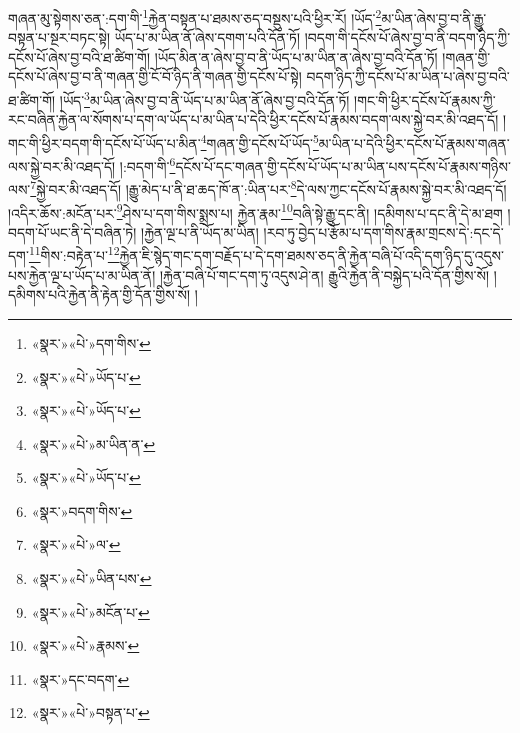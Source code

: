གཞན་མུ་སྟེགས་ཅན་:དག་གི་\footnote{«སྣར་»«པེ་»དག་གིས་}རྐྱེན་བསྟན་པ་ཐམས་ཅད་བསྡུས་པའི་ཕྱིར་རོ། །ཡོད་\footnote{«སྣར་»«པེ་»ཡོད་པ་}མ་ཡིན་ཞེས་བྱ་བ་ནི་རྒྱུ་བསྟན་པ་སྔར་བཏང་སྟེ། ཡོད་པ་མ་ཡིན་ནོ་ཞེས་དགག་པའི་དོན་ཏོ། །བདག་གི་དངོས་པོ་ཞེས་བྱ་བ་ནི་བདག་ཉིད་ཀྱི་དངོས་པོ་ཞེས་བྱ་བའི་ཐ་ཚིག་གོ། །ཡོད་མིན་ན་ཞེས་བྱ་བ་ནི་ཡོད་པ་མ་ཡིན་ན་ཞེས་བྱ་བའི་དོན་ཏོ། །གཞན་གྱི་དངོས་པོ་ཞེས་བྱ་བ་ནི་གཞན་གྱི་ངོ་བོ་ཉིད་ནི་གཞན་གྱི་དངོས་པོ་སྟེ། བདག་ཉིད་ཀྱི་དངོས་པོ་མ་ཡིན་པ་ཞེས་བྱ་བའི་ཐ་ཚིག་གོ། །ཡོད་\footnote{«སྣར་»«པེ་»ཡོད་པ་}མ་ཡིན་ཞེས་བྱ་བ་ནི་ཡོད་པ་མ་ཡིན་ནོ་ཞེས་བྱ་བའི་དོན་ཏོ། །གང་གི་ཕྱིར་དངོས་པོ་རྣམས་ཀྱི་རང་བཞིན་རྐྱེན་ལ་སོགས་པ་དག་ལ་ཡོད་པ་མ་ཡིན་པ་དེའི་ཕྱིར་དངོས་པོ་རྣམས་བདག་ལས་སྐྱེ་བར་མི་འཐད་དོ། །གང་གི་ཕྱིར་བདག་གི་དངོས་པོ་ཡོད་པ་མིན་\footnote{«སྣར་»«པེ་»མ་ཡིན་ན་}གཞན་གྱི་དངོས་པོ་ཡོད་\footnote{«སྣར་»«པེ་»ཡོད་པ་}མ་ཡིན་པ་དེའི་ཕྱིར་དངོས་པོ་རྣམས་གཞན་ལས་སྐྱེ་བར་མི་འཐད་དོ། །:བདག་གི་\footnote{«སྣར་»བདག་གིས་}དངོས་པོ་དང་གཞན་གྱི་དངོས་པོ་ཡོད་པ་མ་ཡིན་པས་དངོས་པོ་རྣམས་གཉིས་ལས་\footnote{«སྣར་»«པེ་»ལ་}སྐྱེ་བར་མི་འཐད་དོ། །རྒྱུ་མེད་པ་ནི་ཐ་ཆད་ཁོ་ན་:ཡིན་པར་\footnote{«སྣར་»«པེ་»ཡིན་པས་}དེ་ལས་ཀྱང་དངོས་པོ་རྣམས་སྐྱེ་བར་མི་འཐད་དོ། །འདིར་ཆོས་:མངོན་པར་\footnote{«སྣར་»«པེ་»མངོན་པ་}ཤེས་པ་དག་གིས་སྨྲས་པ། རྐྱེན་རྣམ་\footnote{«སྣར་»«པེ་»རྣམས་}བཞི་སྟེ་རྒྱུ་དང་ནི། །དམིགས་པ་དང་ནི་དེ་མ་ཐག །བདག་པོ་ཡང་ནི་དེ་བཞིན་ཏེ། །རྐྱེན་ལྔ་པ་ནི་ཡོད་མ་ཡིན། །རབ་ཏུ་བྱེད་པ་རྩོམ་པ་དག་གིས་རྣམ་གྲངས་དེ་:དང་དེ་དག་\footnote{«སྣར་»དང་བདག་}གིས་:བརྟེན་པ་\footnote{«སྣར་»«པེ་»བསྟན་པ་}རྐྱེན་ཇི་སྙེད་གང་དག་བརྗོད་པ་དེ་དག་ཐམས་ཅད་ནི་རྐྱེན་བཞི་པོ་འདི་དག་ཉིད་དུ་འདུས་པས་རྐྱེན་ལྔ་པ་ཡོད་པ་མ་ཡིན་ནོ། །རྐྱེན་བཞི་པོ་གང་དག་ཏུ་འདུས་ཤེ་ན། རྒྱུའི་རྐྱེན་ནི་བསྐྱེད་པའི་དོན་གྱིས་སོ། །དམིགས་པའི་རྐྱེན་ནི་རྟེན་གྱི་དོན་གྱིས་སོ། །
